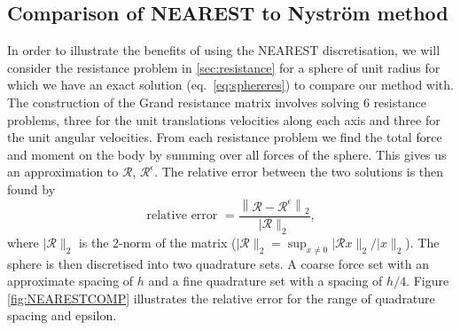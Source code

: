 \subsection{Comparison of NEAREST to Nyström method}
In order to illustrate the benefits of using the NEAREST discretisation, we will consider the resistance problem in \cref{sec:resistance} for a sphere of unit radius for which we have an exact solution (eq.~\ref{eq:sphereres}) to compare our method with. The construction of the Grand resistance matrix involves solving $6$ resistance problems, three for the unit translations velocities along each axis and three for the unit angular velocities. From each resistance problem we find the total force and moment on the body by summing over all forces of the sphere. This gives us an approximation to $\mathcal{R}$, $\mathcal{R}^\epsilon$. The relative error between the two solutions is then found by 
\begin{equation}
    \text { relative error }=\frac{\left\lVert \mathcal{R}-\mathcal{R}^{\epsilon}\right\rVert_{2}}{\lvert\mathcal{R}\rVert_{2}} \text {, }
    \label{eq:RelativeError}
\end{equation}
where ${\lvert\mathcal{R}\rVert_{2}}$ is the 2-norm of the matrix ($\lvert\mathcal{R}\rVert_{2}=\sup_{x \neq 0}\lvert\mathcal{R}x\rVert_{2} /\lvert x\rVert_{2}$).
The sphere is then discretised into two quadrature sets. A coarse force set with an approximate spacing of $h$ and a fine quadrature set with a spacing of $h/4$. Figure \ref{fig:NEARESTCOMP} illustrates the relative error for the range of quadrature spacing and epsilon. 

